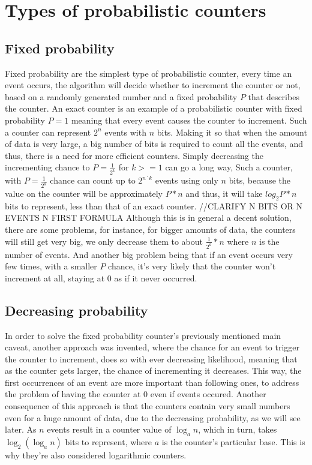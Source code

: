 \documentclass[...]{revdetua}
\begin{document}
\section{Types of probabilistic counters}
\subsection{Fixed probability}
Fixed probability are the simplest type of probabilistic counter, every time an event occurs, the algorithm will decide whether to increment the counter or not, based on a randomly generated number and a fixed probability $P$ that describes the counter.
An exact counter is an example of a probabilistic counter with fixed probability $P=1$ meaning that every event causes the counter to increment. Such a counter can represent $2^n$ events with $n$ bits. Making it so that when the amount of data is very large, a big number of bits is required to count all the events, and thus, there is a need for more efficient counters.
Simply decreasing the incrementing chance to  $P=\frac{1}{2^k}$ for $k>=1$ can go a long way,
Such a counter, with $P=\frac{1}{2^k}$ chance can count up to $2^{n´k}$ events using only $n$ bits, because the value on the counter will be approximately $P*n$ and thus, it will take $log_2 P*n$ bits to represent, less than that of an exact counter. //CLARIFY N BITS OR N EVENTS N FIRST FORMULA
Although this is in general a decent solution, there are some problems, for instance, for bigger amounts of data, the counters will still get very big, we only decrease them to about $\frac{1}{2^k}*n$ where $n$ is the number of events. And another big problem being that if an event occurs very few times, with a smaller $P$ chance, it's very likely that the counter won't increment at all, staying at $0$ as if it never occurred.
\subsection{Decreasing probability}
In order to solve the fixed probability counter's previously mentioned main caveat, another approach was invented, where the chance for an event to trigger the counter to increment, does so with ever decreasing likelihood, meaning that as the counter gets larger, the chance of incrementing it decreases.
This way, the first occurrences of an event are more important than following ones, to address the problem of having the counter at $0$ even if events occured.
Another consequence of this approach is that the counters contain very small numbers even for a huge amount of data, due to the decreasing probability, as we will see later. As $n$ events result in a counter value of ${\log_a n}$, which in turn, takes $\log_2 ({\log_a n})$ bits to represent, where $a$ is the counter's particular base. This is why they're also considered logarithmic counters.
\end{document}
